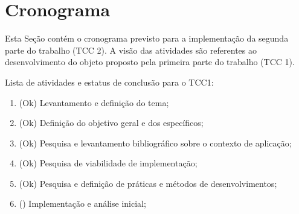 \section{Cronograma}
\label{sec:cron}

Esta Seção contém o cronograma previsto para a implementação da segunda
parte do trabalho (TCC 2). A visão das atividades são referentes ao
desenvolvimento do objeto proposto pela primeira parte do trabalho (TCC 1).

Lista de atividades e estatus de conclusão para o TCC1:
\begin{enumerate}
  \item (Ok) Levantamento e definição do tema;
  \item (Ok) Definição do objetivo geral e dos específicos;
  \item (Ok) Pesquisa e levantamento bibliográfico sobre o contexto de aplicação;
  \item (Ok) Pesquisa de viabilidade de implementação;
  \item (Ok) Pesquisa e definição de práticas e métodos de desenvolvimentos;
  \item (\hspace{17pt}) Implementação e análise inicial;
\end{enumerate}

